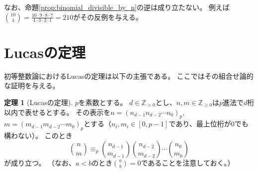 ﻿\documentclass{ltjsarticle}
\theoremstyle{definition}
\newtheorem{theorem}{定理}
\begin{document}
なお、命題\ref{prop:binomial_divisible_by_n}の逆は成り立たない。
例えば$\binom{10}{4} = \frac{ 10 \cdot 9 \cdot 8 \cdot 7 }{ 4 \cdot 3 \cdot 2 \cdot 1 } = 210$がその反例を与える。


\section{Lucasの定理}

初等整数論におけるLucasの定理\cite{Lucas78}は以下の主張である。
ここではその組合せ論的な証明を与える。

\begin{theorem}
    [Lucasの定理]
    \label{thm:Lucas'_Theorem}
    $p$を素数とする。
    $d \in \mathbb{Z}_{>0}$とし、$n,m \in \mathbb{Z}_{\geq 0}$は$p$進法で$d$桁以内で表せるとする。
    その表示を$n = (n_{d-1} n_{d-2} \cdots n_0)_p$, $m = (m_{d-1} m_{d-2} \cdots m_0)_p$とする（$n_i, m_i \in [0,p-1]$であり、最上位桁が$0$でも構わない）。
    このとき
    \[
        \binom{n}{m} \equiv_p \binom{n_{d-1}}{m_{d-1}} \binom{n_{d-2}}{m_{d-2}} \cdots \binom{n_0}{m_0}
    \]
    が成り立つ。
    （なお、$a < b$のとき$\binom{a}{b} = 0$であることを注意しておく。）
\end{theorem}
\end{document}
